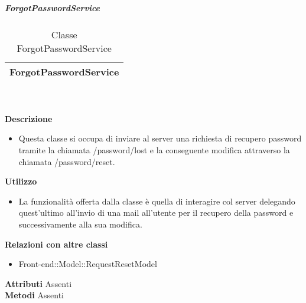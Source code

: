 			\subparagraph{ForgotPasswordService} 
\begin{table}[ht]
\begin{center}
\bgroup
	\setlength{\arrayrulewidth}{0.6mm}
	\def\arraystretch{1}
		\begin{tabular}{ | p{12cm} | }
				\hline  
					\centerline{\textbf{ForgotPasswordService}}
		\\ \hline 
				\hline
				\hline
		
		\end{tabular}
\egroup
\caption{Classe ForgotPasswordService}
\end{center}
\end{table} \textbf{\\ \\ Descrizione}
\begin{itemize}
\item[] Questa classe si occupa di inviare al server una richiesta di recupero password tramite la chiamata /password/lost e la conseguente modifica attraverso la chiamata /password/reset.
\end{itemize} 
\textbf{Utilizzo}
\begin{itemize}
\item[] La  funzionalità offerta dalla classe è quella di interagire col server delegando quest'ultimo all'invio di una mail all'utente per il recupero della password e successivamente alla sua modifica.
\end{itemize}
\textbf{Relazioni con altre classi}
\begin{itemize}
\item{Front-end::Model::RequestResetModel}
\end{itemize}
\textbf{Attributi}
Assenti \\
\textbf{Metodi}
Assenti \\

